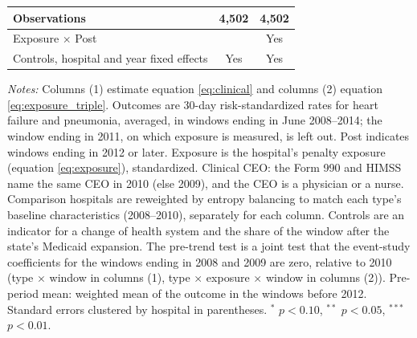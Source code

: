 \begin{table}
\begin{threeparttable}
\begin{tabular}[t]{lcc}
\hspace{1em}Observations & 4,502 & 4,502\\
\midrule
Exposure $\times$ Post &  & Yes\\
Controls, hospital and year fixed effects & Yes & Yes\\
\bottomrule
\end{tabular}
\begin{tablenotes}[flushleft]
\footnotesize
\item \textit{Notes:} Columns (1) estimate equation \eqref{eq:clinical} and columns (2) equation \eqref{eq:exposure_triple}. Outcomes are 30-day risk-standardized rates for heart failure and pneumonia, averaged, in windows ending in June 2008--2014; the window ending in 2011, on which exposure is measured, is left out. Post indicates windows ending in 2012 or later. Exposure is the hospital's penalty exposure (equation \eqref{eq:exposure}), standardized. Clinical CEO: the Form 990 and HIMSS name the same CEO in 2010 (else 2009), and the CEO is a physician or a nurse. Comparison hospitals are reweighted by entropy balancing to match each type's baseline characteristics (2008--2010), separately for each column. Controls are an indicator for a change of health system and the share of the window after the state's Medicaid expansion. The pre-trend test is a joint test that the event-study coefficients for the windows ending in 2008 and 2009 are zero, relative to 2010 (type $\times$ window in columns (1), type $\times$ exposure $\times$ window in columns (2)). Pre-period mean: weighted mean of the outcome in the windows before 2012. Standard errors clustered by hospital in parentheses. $^{*}$ $p<0.10$, $^{**}$ $p<0.05$, $^{***}$ $p<0.01$.
\end{tablenotes}
\end{threeparttable}
\end{table}
